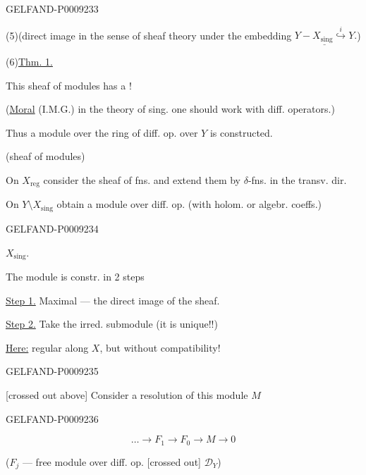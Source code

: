 \begin{GelfandAdjacentEvidence}{GELFAND-P000923}{3}


(5)\quad (direct image in the sense of sheaf theory under the embedding $\underline{Y-X_{\mathrm{sing}}\overset{i}{\hookrightarrow}Y}.$)

(6)\quad \underline{Thm. 1.}

This sheaf of modules has a !

(\underline{Moral} (I.M.G.) in the theory of sing. one should work with diff. operators.)

Thus a module over the ring of diff. op. over $Y$ is constructed.

(sheaf of modules)

On $X_{\mathrm{reg}}$ consider the sheaf of fns. and extend them by $\delta$-fns. in the transv. dir.

On $Y\setminus X_{\mathrm{sing}}$ obtain a module over diff. op. (with holom. or algebr. coeffs.)
\end{GelfandAdjacentEvidence}
\begin{GelfandAdjacentEvidence}{GELFAND-P000923}{4}


 $X_{\mathrm{sing}}$.

The module is constr. in 2 steps

\underline{Step 1.} Maximal --- the direct image of the sheaf.

\underline{Step 2.} Take the irred. submodule (it is unique!!)

\underline{Here:} regular along $X$, but without compatibility!
\end{GelfandAdjacentEvidence}
\begin{GelfandAdjacentEvidence}{GELFAND-P000923}{5}


[crossed out above] Consider a resolution of this module $M$
\end{GelfandAdjacentEvidence}
\begin{GelfandAdjacentEvidence}{GELFAND-P000923}{6}

\begin{equation*}
 \ldots\longrightarrow F_1\longrightarrow F_0\longrightarrow M\longrightarrow0
 \tag{7}
\end{equation*}

($F_j$ --- free module over diff. op. [crossed out] $\mathcal D_Y$)
\end{GelfandAdjacentEvidence}


